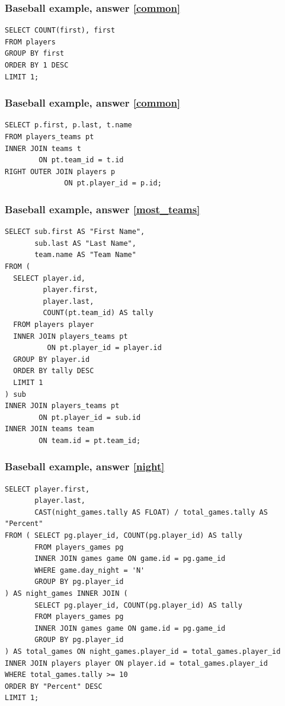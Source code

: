 \documentclass[aspectratio=169]{beamer}
\begin{document}
\begin{frame}[fragile]
  \frametitle{Baseball example, answer \ref{common}}
  \begin{lstlisting}
SELECT COUNT(first), first
FROM players
GROUP BY first
ORDER BY 1 DESC
LIMIT 1;
  \end{lstlisting}
\end{frame}

\begin{frame}[fragile]
  \frametitle{Baseball example, answer \ref{common}}
  \begin{lstlisting}
SELECT p.first, p.last, t.name
FROM players_teams pt
INNER JOIN teams t
        ON pt.team_id = t.id
RIGHT OUTER JOIN players p
              ON pt.player_id = p.id;
  \end{lstlisting}
\end{frame}

\begin{frame}[fragile]
  \frametitle{Baseball example, answer \ref{most_teams}}
  \begin{lstlisting}
SELECT sub.first AS "First Name",
       sub.last AS "Last Name",
       team.name AS "Team Name"
FROM (
  SELECT player.id,
         player.first,
         player.last,
         COUNT(pt.team_id) AS tally
  FROM players player
  INNER JOIN players_teams pt
          ON pt.player_id = player.id
  GROUP BY player.id
  ORDER BY tally DESC
  LIMIT 1
) sub
INNER JOIN players_teams pt
        ON pt.player_id = sub.id
INNER JOIN teams team
        ON team.id = pt.team_id;
  \end{lstlisting}
\end{frame}

\begin{frame}[fragile]
  \frametitle{Baseball example, answer \ref{night}}
  \begin{lstlisting}
SELECT player.first,
       player.last,
       CAST(night_games.tally AS FLOAT) / total_games.tally AS "Percent"
FROM ( SELECT pg.player_id, COUNT(pg.player_id) AS tally
       FROM players_games pg
       INNER JOIN games game ON game.id = pg.game_id
       WHERE game.day_night = 'N'
       GROUP BY pg.player_id
) AS night_games INNER JOIN (
       SELECT pg.player_id, COUNT(pg.player_id) AS tally
       FROM players_games pg
       INNER JOIN games game ON game.id = pg.game_id
       GROUP BY pg.player_id
) AS total_games ON night_games.player_id = total_games.player_id
INNER JOIN players player ON player.id = total_games.player_id
WHERE total_games.tally >= 10
ORDER BY "Percent" DESC
LIMIT 1;
  \end{lstlisting}
\end{frame}
\end{document}
